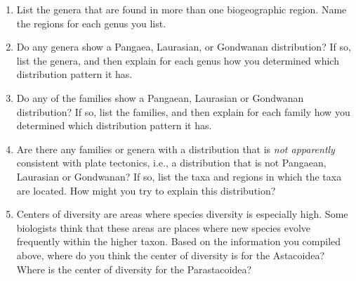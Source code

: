 \documentclass[11pt]{article}
\begin{document}
\begin{enumerate}[resume, leftmargin=*]
\begin{multicols}{2}
Greatest number of genera:\vspace{2\baselineskip}

Least number of genera: \vspace{2\baselineskip}

 Greatest number of species:\vspace{2\baselineskip}
 
 Least number of species:\vspace{2\baselineskip}
 
 \end{multicols}
 
 \vspace{\baselineskip}
 
\item List the genera that are found in more than one biogeographic region.
Name the regions for each genus you list.

\item Do any genera show a Pangaea, Laurasian, or Gondwanan distribution?
If so, list the genera, and then explain for each genus how you
determined which distribution pattern it has.

\newpage
\item Do any of the families show a Pangaean, Laurasian or Gondwanan
distribution? If so, list the families, and then explain for each family
how you determined which distribution pattern it has.

\item Are there any families or genera with a distribution that is
\emph{not apparently} consistent with plate tectonics, i.e., a
distribution that is not Pangaean, Laurasian or Gondwanan? If so, list
the taxa and regions in which the taxa are located. How might you try to
explain this distribution?

\item Centers of diversity are areas where species diversity is especially
high. Some biologists think that these areas are places where new
species evolve frequently within the higher taxon. Based on the
information you compiled above, where do you think the center of
diversity is for the Astacoidea? Where is the center of diversity for
the Parastacoidea?

\end{enumerate}
\end{document}
